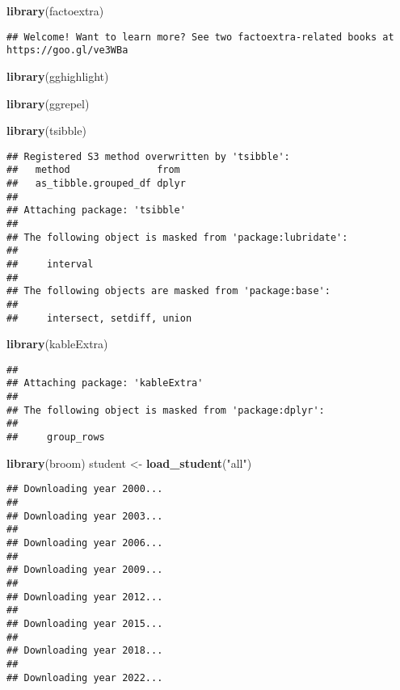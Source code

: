 \documentclass[
]{article}
\newenvironment{Shaded}{\begin{snugshade}}{\end{snugshade}}
\newcommand{\FunctionTok}[1]{\textcolor[rgb]{0.13,0.29,0.53}{\textbf{#1}}}
\newcommand{\NormalTok}[1]{#1}
\newcommand{\OtherTok}[1]{\textcolor[rgb]{0.56,0.35,0.01}{#1}}
\newcommand{\StringTok}[1]{\textcolor[rgb]{0.31,0.60,0.02}{#1}}
\begin{document}
\begin{Shaded}
\begin{Highlighting}[]
\FunctionTok{library}\NormalTok{(factoextra) }
\end{Highlighting}
\end{Shaded}

\begin{verbatim}
## Welcome! Want to learn more? See two factoextra-related books at https://goo.gl/ve3WBa
\end{verbatim}

\begin{Shaded}
\begin{Highlighting}[]
\FunctionTok{library}\NormalTok{(gghighlight)}

\FunctionTok{library}\NormalTok{(ggrepel)}

\FunctionTok{library}\NormalTok{(tsibble)}
\end{Highlighting}
\end{Shaded}

\begin{verbatim}
## Registered S3 method overwritten by 'tsibble':
##   method               from 
##   as_tibble.grouped_df dplyr
## 
## Attaching package: 'tsibble'
## 
## The following object is masked from 'package:lubridate':
## 
##     interval
## 
## The following objects are masked from 'package:base':
## 
##     intersect, setdiff, union
\end{verbatim}

\begin{Shaded}
\begin{Highlighting}[]
\FunctionTok{library}\NormalTok{(kableExtra)}
\end{Highlighting}
\end{Shaded}

\begin{verbatim}
## 
## Attaching package: 'kableExtra'
## 
## The following object is masked from 'package:dplyr':
## 
##     group_rows
\end{verbatim}

\begin{Shaded}
\begin{Highlighting}[]
\FunctionTok{library}\NormalTok{(broom)}
\NormalTok{student }\OtherTok{\textless{}{-}} \FunctionTok{load\_student}\NormalTok{(}\StringTok{"all"}\NormalTok{)}
\end{Highlighting}
\end{Shaded}

\begin{verbatim}
## Downloading year 2000...
## 
## Downloading year 2003...
## 
## Downloading year 2006...
## 
## Downloading year 2009...
## 
## Downloading year 2012...
## 
## Downloading year 2015...
## 
## Downloading year 2018...
## 
## Downloading year 2022...
\end{verbatim}
\end{document}
